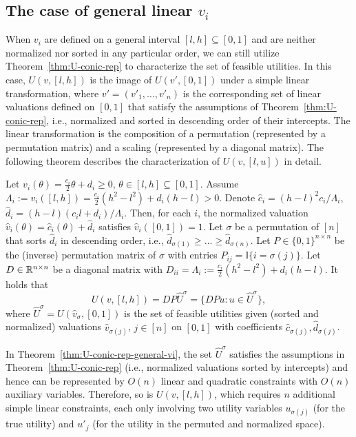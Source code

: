 \subsection{The case of general linear $v_i$}
When $v_i$ are defined on a general interval $[l,h]\subseteq [0,1]$ and are neither normalized nor sorted in any particular order, we can still utilize Theorem~\ref{thm:U-conic-rep} to characterize the set of feasible utilities. 
In this case, $U(v, [l,h])$ is the image of $U(v', [0,1])$ under a simple linear transformation, where $v' = (v'_1, \dots, v'_n)$ is the corresponding set of linear valuations defined on $[0,1]$ that satisfy the assumptions of Theorem~\ref{thm:U-conic-rep}, i.e., normalized and sorted in descending order of their intercepts. 
The linear transformation is the composition of a permutation (represented by a permutation matrix) and a scaling (represented by a diagonal matrix). The following theorem describes the characterization of $U(v, [l,u])$ in detail.
\begin{theorem}
	Let $v_i(\theta) = \frac{c_i}{2}\theta+d_i \geq 0$, $\theta\in [l,h]\subseteq [0,1]$. 
	Assume 
	$\Lambda_i := v_i([l,h]) = \frac{c_i}{2}(h^2 - l^2) + d_i(h-l) > 0$.
	Denote $\hat{c}_i = (h-l)^2 c_i/ \Lambda_i$, $\hat{d}_i = (h-l) (c_i l + d_i) /\Lambda_i$. Then, for each $i$, the normalized valuation
	$ \hat{v}_i(\theta) = \hat{c}_i(\theta)+\hat{d}_i$ 
	satisfies $\hat{v}_i([0,1]) = 1$.
	Let $\sigma$ be a permutation of $[n]$ that sorts $\hat{d}_i$ in descending order, i.e., $\hat{d}_{\sigma(1)} \geq \dots \geq \hat{d}_{\sigma(n)}$. 
	Let $P\in \{0,1\}^{n\times n}$ be the (inverse) permutation matrix of $\sigma$ with entries $P_{ij} = \mathbb{I}\{i = \sigma(j)\}$. 
	Let $D\in \mathbb{R}^{n\times n}$ be a diagonal matrix with $D_{ii} = \Lambda_i := \frac{c_i}{2}(h^2-l^2) + d_i(h-l)$. It holds that
		 \[ U(v, [l,h]) = D P \hat{U}^\sigma = \{ DP u: u\in \hat{U}^\sigma \}, \]
	where $\hat{U}^\sigma = U(\hat{v}_{\sigma}, [0,1])$ is the set of feasible utilities given (sorted and normalized) valuations $\hat{v}_{\sigma(j)}$, $j \in [n]$ on $[0,1]$ with coefficients $\hat{c}_{\sigma(j)}, \hat{d}_{\sigma(j)}$.
	\label{thm:U-conic-rep-general-vi}
\end{theorem}
In Theorem~\ref{thm:U-conic-rep-general-vi}, the set $\hat{U}^\sigma$ satisfies the assumptions in Theorem~\ref{thm:U-conic-rep} (i.e., normalized valuations sorted by intercepts) and hence can be represented by $O(n)$ linear and quadratic constraints with $O(n)$ auxiliary variables. Therefore, so is $U(v, [l,h])$, which requires $n$ additional simple linear constraints, each only involving two utility variables $u_{\sigma(j)}$ (for the true utility) and $u'_j$ (for the utility in the permuted and normalized space).

